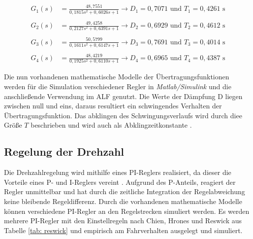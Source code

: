 			 
			\begin{align}
			 \label{eq: g1tfest}
			  G_{1}(s)&=\frac{48{,}7551}{0{,}1815s^2+0{,}6026s+1} \rightarrow D_{1}=0{,}7071 \text{ und } T_{1}=0{,}4261\text{ s}\\\nonumber\\
			 \label{eq: g2tfest}
			 G_{2}(s)&=\frac{49{,}4258}{0{,}2127s^2+0{,}6391s+1} \rightarrow D_{2}=0{,}6929 \text{ und } T_{2}=0{,}4612\text{ s}\\\nonumber\\
			 \label{eq: g3tfest}
			 G_{3}(s)&=\frac{50{,}5799}{0{,}1611s^2+0{,}6147s+1} \rightarrow D_{3}=0{,}7691 \text{ und } T_{3}=0{,}4014\text{ s}\\\nonumber\\
			 \label{eq: g4tfest}
			 G_{4}(s)&=\frac{48{,}4219}{0{,}1925s^2+0{,}6110s+1} \rightarrow D_{4}=0{,}6965 \text{ und } T_{4}=0{,}4387\text{ s}
			 \end{align}\newline
			 
			 
			
			 
			Die nun vorhandenen mathematische Modelle der Übertragungsfunktionen werden für die Simulation verschiedener Regler in \textit{Matlab/Simulink} und die anschließende Verwendung im ALF genutzt. Die Werte der Dämpfung D liegen zwischen null und eins, daraus resultiert ein schwingendes Verhalten der Übertragungsfunktion. Das abklingen des Schwingungsverlaufs wird durch diee Größe $T$ beschrieben und wird auch als Abklingzeitkonstante \cite{unbehauen}.
			
			
		\subsection{Regelung der Drehzahl}
		\label{sec: Drehzahlregelung}
		
		Die Drehzahlregelung wird mithilfe eines PI-Reglers realisiert, da dieser die Vorteile eines P- und I-Reglers vereint \cite{praktischeregelungstechnik}. Aufgrund des P-Anteils, reagiert der Regler unmittelbar und hat durch die zeitliche Integration der Regelabweichung keine bleibende Regeldifferenz. Durch die vorhandenen mathematische Modelle können verschiedene PI-Regler an den Regelstrecken simuliert werden. Es werden mehrere PI-Regler mit den Einstellregeln nach Chien, Hrones und Reswick aus Tabelle \ref{tab: reswick} und empirisch am Fahrverhalten ausgelegt und simuliert.
		
